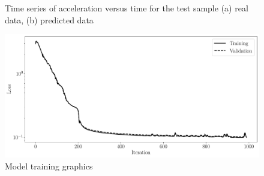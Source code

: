 \documentclass[12pt]{paper}
\begin{document}
\begin{figure}[!htbp]
 \caption{Time series of acceleration versus time for the test sample (a) real data, (b) predicted data}
 \label{fig: trajectory}
\end{figure}

\begin{figure}[!htbp]
\centering\includegraphics[scale = 0.42]{experiment4_1000.pickle_loss.pdf}
\caption{Model training graphics}
\label{fig: learning_rate}
\end{figure}
\end{document}
